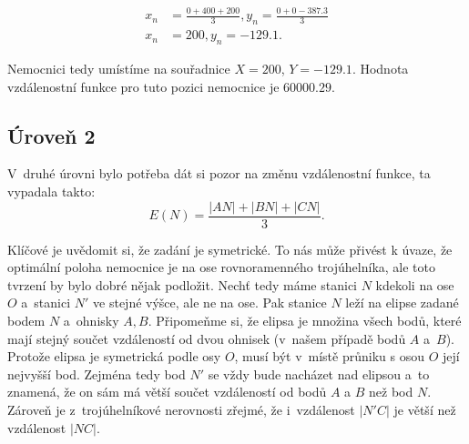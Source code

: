 \documentclass[12pt,a4paper]{article}
\begin{document}
\begin{align}
x_n &= \frac{0 + 400 + 200}{3}, y_n = \frac{0 + 0 - 387.3}{3} \nonumber \\
x_n &= 200, y_n = -129.1  \nonumber.
\end{align}

Nemocnici tedy umístíme na souřadnice $X=200$, $Y=-129.1$. Hodnota vzdálenostní
funkce pro tuto pozici nemocnice je $60000.29$.

\subsection*{Úroveň 2}
V~druhé úrovni bylo potřeba dát si pozor na změnu vzdálenostní funkce, ta vypadala takto:
$$E(N) = \frac{|AN| + |BN| + |CN|}{3}.$$

Klíčové je uvědomit si, že zadání je symetrické. To nás může přivést k úvaze, že optimální poloha nemocnice je na ose rovnoramenného trojúhelníka,
ale toto tvrzení by bylo dobré nějak podložit. Nechť tedy máme stanici $N$ kdekoli na ose $O$ a~stanici $N'$ ve stejné výšce, ale ne na ose. Pak stanice $N$ leží na elipse zadané bodem $N$ a~ohnisky $A,B$.
Připomeňme si, že elipsa je množina všech bodů, které mají stejný součet vzdáleností od dvou ohnisek (v~našem případě bodů $A$ a~$B$). Protože elipsa je symetrická podle osy $O$,
musí být v~místě průniku s osou $O$ její nejvyšší bod. Zejména tedy bod $N'$ se vždy bude nacházet nad elipsou a~to znamená, že on sám má větší součet vzdáleností od bodů $A$ a $B$ než bod $N$.
Zároveň je z~trojúhelníkové nerovnosti zřejmé, že i~vzdálenost $|N'C|$ je větší než vzdálenost $|NC|$.

\end{document}
